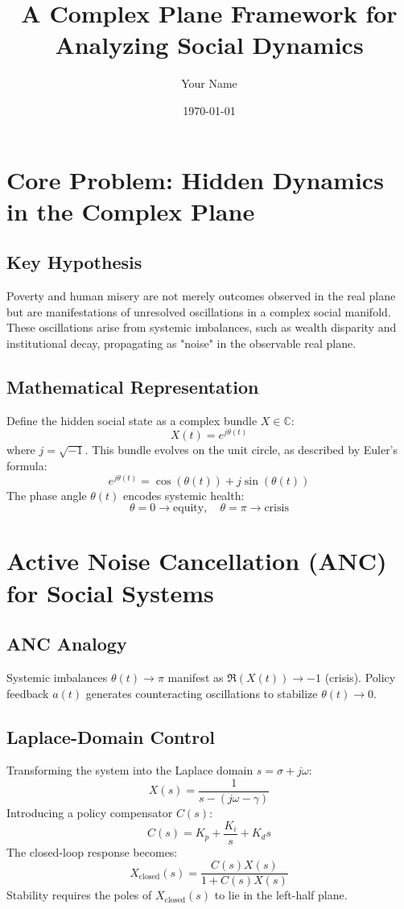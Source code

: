 \documentclass{article}
\theoremstyle{definition}
\begin{document}
\title{A Complex Plane Framework for Analyzing Social Dynamics}
\author{Your Name}
\date{\today}


\maketitle

\section{Core Problem: Hidden Dynamics in the Complex Plane}

\subsection{Key Hypothesis}
Poverty and human misery are not merely outcomes observed in the real plane but are manifestations of unresolved oscillations in a complex social manifold. These oscillations arise from systemic imbalances, such as wealth disparity and institutional decay, propagating as "noise" in the observable real plane.

\subsection{Mathematical Representation}
Define the hidden social state as a complex bundle \( X \in \mathbb{C} \):
\[
X(t) = e^{j\theta(t)}
\]
where \( j = \sqrt{-1} \). This bundle evolves on the unit circle, as described by Euler’s formula:
\[
e^{j\theta(t)} = \cos(\theta(t)) + j\sin(\theta(t))
\]
The phase angle \( \theta(t) \) encodes systemic health:
\[
\theta = 0 \rightarrow \text{equity}, \quad \theta = \pi \rightarrow \text{crisis}
\]

\section{Active Noise Cancellation (ANC) for Social Systems}

\subsection{ANC Analogy}
Systemic imbalances \( \theta(t) \rightarrow \pi \) manifest as \( \Re(X(t)) \rightarrow -1 \) (crisis). Policy feedback \( a(t) \) generates counteracting oscillations to stabilize \( \theta(t) \rightarrow 0 \).

\subsection{Laplace-Domain Control}
Transforming the system into the Laplace domain \( s = \sigma + j\omega \):
\[
X(s) = \frac{1}{s - (j\omega - \gamma)}
\]
Introducing a policy compensator \( C(s) \):
\[
C(s) = K_p + \frac{K_i}{s} + K_d s
\]
The closed-loop response becomes:
\[
X_{\text{closed}}(s) = \frac{C(s) X(s)}{1 + C(s) X(s)}
\]
Stability requires the poles of \( X_{\text{closed}}(s) \) to lie in the left-half plane.
\end{document}
